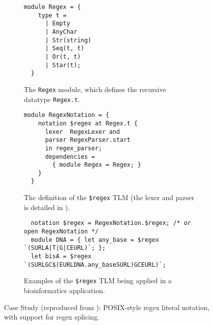 \documentclass[acmsmall,review]{acmart}
\newcommand{\li}[1]{\lstinline[basicstyle=\ttfamily\fontsize{9pt}{1em}\selectfont]{#1}}
\theoremstyle{slplain}
\numberwithin{thm}{section}
\begin{document}
\begin{figure}[t]
\begin{subfigure}[t]{0.45\textwidth}
\vspace{-1px}
\begin{lstlisting}[mathescape=~]
  module Regex = {
    type t = 
      | Empty
      | AnyChar 
      | Str(string)
      | Seq(t, t) 
      | Or(t, t) 
      | Star(t);
  }
\end{lstlisting}
\vspace{-5px}
\caption{The \li{Regex} module, which defines the recursive datatype \li{Regex.t}.}
\label{fig:Regex-module-def}
\end{subfigure}
\hfill
\begin{subfigure}[t]{0.53\textwidth}
\vspace{-1px}
\begin{lstlisting}[mathescape=|]
  module RegexNotation = {
    notation $regex at Regex.t {
      lexer  RegexLexer and 
      parser RegexParser.start
      in regex_parser;
      dependencies = 
        { module Regex = Regex; }
    }
  }
\end{lstlisting}
\vspace{-5px}
\caption{The definition of the \li{$regex} TLM (the lexer and parser is detailed in \cite{TLMs-paper}).}
\label{fig:regex-tlm-def}
\end{subfigure}

\begin{subfigure}[t]{\textwidth}
\vspace{5px}
\begin{lstlisting}
  notation $regex = RegexNotation.$regex; /* or open RegexNotation */
  module DNA = { let any_base = $regex `(SURLA|T|G|CEURL)`; };
  let bisA = $regex `(SURLGC$(EURLDNA.any_baseSURL)GCEURL)`;
\end{lstlisting}
\vspace{-4px}
\caption{Examples of the \li{$regex} TLM being applied in a bioinformatics application. %
}
\label{fig:first-tlm-example}
\end{subfigure}
\vspace{5px}
\caption{Case Study (reproduced from \cite{TLMs-paper}): POSIX-style regex literal notation, with support for regex splicing.}
\label{fig:regex-case-study}
\end{figure}
\end{document}
